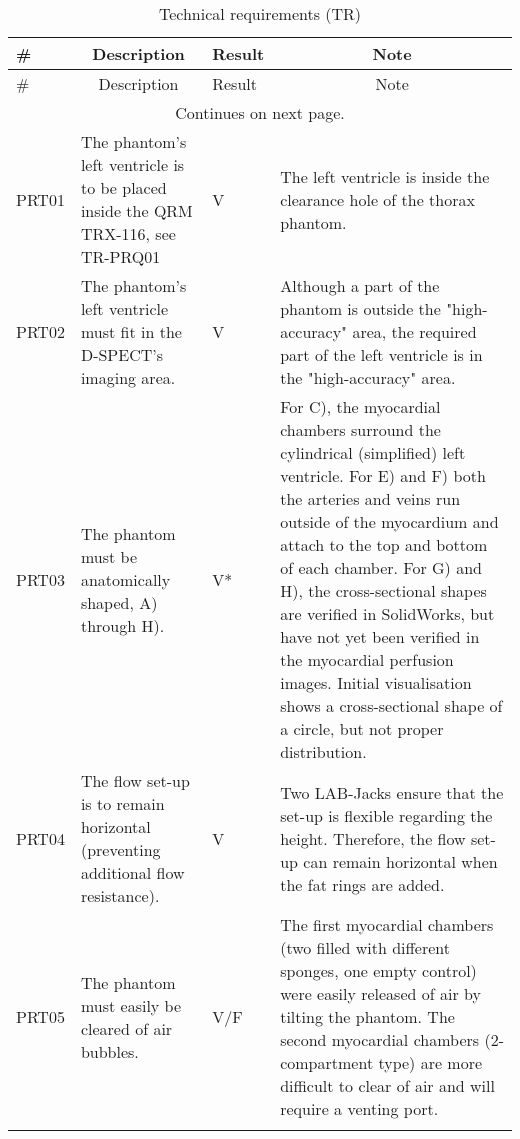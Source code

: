 				\begin{longtable}{m{1.5cm}|m{5.25cm}>{\centering\arraybackslash}m{1cm}m{5.75cm}|}
		\caption{Technical requirements (TR)}
		\label{tab:tr_requirements} \\
		\# & \multicolumn{1}{c}{Description} & Result & \multicolumn{1}{c}{Note} \\ \hline 
		\endfirsthead
		
		\# & \multicolumn{1}{c}{Description} & Result & \multicolumn{1}{c}{Note} \\ \hline 
		\endhead
		
		\cline{2-4} \multicolumn{4}{c}{Continues on next page.} \\
		\endfoot
		
		\cline{2-4}
		\endlastfoot
		PRT01	& The phantom's left ventricle is to be placed inside the QRM TRX-116, see TR-PRQ01 & \cellcolor{green!50}V & The left ventricle is inside the clearance hole of the thorax phantom. \\
		PRT02	& The phantom's left ventricle must fit in the D-SPECT's imaging area. & \cellcolor{green!50}V & Although a part of the phantom is outside the "high-accuracy" area, the required part of the left ventricle is in the "high-accuracy" area. \\
		PRT03	& The phantom must be anatomically shaped, A) through H). & \cellcolor{yellow!50}V* & For C), the myocardial chambers surround the cylindrical (simplified) left ventricle. For E) and F) both the arteries and veins run outside of the myocardium and attach to the top and bottom of each chamber. For G) and H), the cross-sectional shapes are verified in SolidWorks, but have not yet been verified in the myocardial perfusion images. Initial visualisation shows a cross-sectional shape of a circle, but not proper distribution. \\
		PRT04	& The flow set-up is to remain horizontal (preventing additional flow resistance). & \cellcolor{green!50}V & Two LAB-Jacks ensure that the set-up is flexible regarding the height. Therefore, the flow set-up can remain horizontal when the fat rings are added. \\
		PRT05	& The phantom must easily be cleared of air bubbles. & \cellcolor{yellow!50}V/F & The first myocardial chambers (two filled with different sponges, one empty control) were easily released of air by tilting the phantom. The second myocardial chambers (2-compartment type) are more difficult to clear of air and will require a venting port. \\
					& & & \\

\end{longtable}
